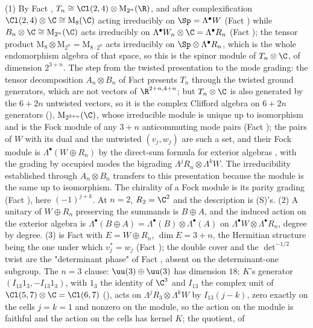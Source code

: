 (1) By Fact , $T_{n} \cong \Cl(2,4) \otimes \mathrm{M}_{2^{n}}(\R)$, and after complexification $\Cl(2,4) \otimes \C \cong \mathrm{M}_{8}(\C)$ acting irreducibly on $\Sp = \Lambda^{\bullet}W$ (Fact ) while $B_{n} \otimes \C \cong \mathrm{M}_{2^{n}}(\C)$ acts irreducibly on $\Lambda^{\bullet}W_{n} \otimes \C = \Lambda^{\bullet}R_{n}$ (Fact ); the tensor product $\mathrm{M}_{8} \otimes \mathrm{M}_{2^{n}} = \mathrm{M}_{8 \cdot 2^{n}}$ acts irreducibly on $\Sp \otimes \Lambda^{\bullet}R_{n}$, which is the whole endomorphism algebra of that space, so this is the spinor module of $T_{n} \otimes \C$, of dimension $2^{3+n}$. The step from the twisted presentation to the mode grading: the tensor decomposition $A_{n} \otimes B_{n}$ of Fact  presents $T_{n}$ through the twisted ground generators, which are not vectors of $\R^{2+n,4+n}$; but $T_{n} \otimes \C$ is also generated by the $6 + 2n$ untwisted vectors, so it is the complex Clifford algebra on $6 + 2n$ generators (), $\mathrm{M}_{2^{3+n}}(\C)$, whose irreducible module is unique up to isomorphism and is the Fock module of any $3 + n$ anticommuting mode pairs (Fact ); the pairs of $W$ with its dual and the untwisted $(v_{j}, w_{j})$ are such a set, and their Fock module is $\Lambda^{\bullet}(W \oplus R_{n})$ by the direct-sum formula for exterior algebras \cite[App.~B.2]{FultonHarris1991}, with the grading by occupied modes the bigrading $\Lambda^{j}R_{n} \otimes \Lambda^{k}W$. The irreducibility established through $A_{n} \otimes B_{n}$ transfers to this presentation because the module is the same up to isomorphism. The chirality of a Fock module is its parity grading (Fact ), here $(-1)^{j+k}$. At $n = 2$, $R_{2} = \C^{2}$ and the description is (S)'s. (2) A unitary of $W \oplus R_{n}$ preserving the summands is $B \oplus A$, and the induced action on the exterior algebra is $\Lambda^{\bullet}(B \oplus A) = \Lambda^{\bullet}(B) \otimes \Lambda^{\bullet}(A)$ on $\Lambda^{\bullet}W \otimes \Lambda^{\bullet}R_{n}$, degree by degree. (3) is Fact  with $E = W \oplus R_{n}$, $\dim E = 3 + n$, the Hermitian structure being the one under which $v_{j}^{*} = w_{j}$ (Fact ); the double cover and the $\det^{-1/2}$ twist are the "determinant phase" of Fact , absent on the determinant-one subgroup. The $n = 3$ clause: $\uu(3) \oplus \uu(3)$ has dimension $18$; $K$'s generator $(I_{13}1_{3}, -I_{13}1_{3})$, with $1_{3}$ the identity of $\C^{3}$ and $I_{13}$ the complex unit of $\Cl(5,7) \otimes \C = \Cl(6,7)$ (), acts on $\Lambda^{j}R_{3} \otimes \Lambda^{k}W$ by $I_{13}(j - k)$, zero exactly on the cells $j = k = 1$ and nonzero on the module, so the action on the module is faithful and the action on the cells has kernel $K$; the quotient, of 